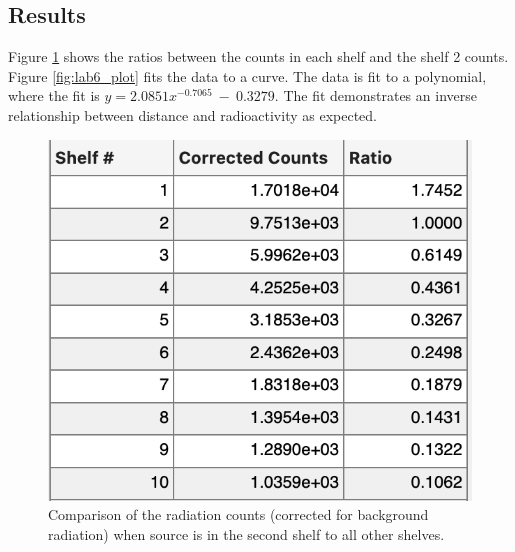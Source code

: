 \documentclass[reprint,amsmath,amssymb,aps,prl]{revtex4-2}
\begin{document}
\subsection{Results}
Figure \ref{fig:lab6_shelf_ratios} shows the ratios between the counts in each shelf and the shelf 2 counts. Figure \ref{fig:lab6_plot} fits the data to a curve. The data is fit to a polynomial, where the fit is $y = 2.0851 x^{-0.7065} \ - \ 0.3279$. The fit demonstrates an inverse relationship between distance and radioactivity as expected. 

\begin{figure}
    \centering
    \includegraphics[width = \columnwidth]{lab6_shelf_ratios.png}
    \caption{Comparison of the radiation counts (corrected for background radiation) when source is in the second shelf to all other shelves. }
    \label{fig:lab6_shelf_ratios}
\end{figure}
\end{document}
